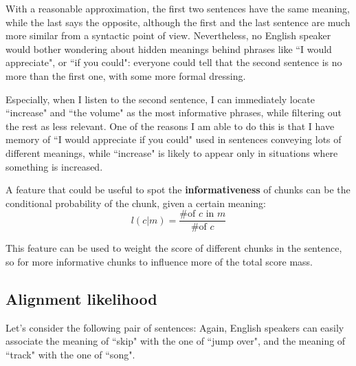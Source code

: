 With a reasonable approximation, the first two sentences have the same meaning, while the last says the opposite, although the first and the last sentence are much more similar from a syntactic point of view. Nevertheless, no English speaker would bother wondering about hidden meanings behind phrases like ``I would appreciate", or ``if you could": everyone could tell that the second sentence is no more than the first one, with some more formal dressing.

Especially, when I listen to the second sentence, I can immediately locate ``increase" and ``the volume" as the most informative phrases, while filtering out the rest as less relevant. One of the reasons I am able to do this is that I have memory of ``I would appreciate if you could" used in sentences conveying lots of different meanings, while ``increase" is likely to appear only in situations where something is increased.

A feature that could be useful to spot the \textbf{informativeness} of chunks can be the conditional probability of the chunk, given a certain meaning:
$$
l(c|m)=\frac{\text{\# of }c\text{ in }m}{\text{\# of }c}
$$

This feature can be used to weight the score of different chunks in the sentence, so for more informative chunks to influence more of the total score mass.
\subsection{Alignment likelihood}\label{ch3:ml:al}
Let's consider the following pair of sentences:
Again, English speakers can easily associate the meaning of ``skip" with the one of ``jump over", and the meaning of ``track" with the one of ``song".


